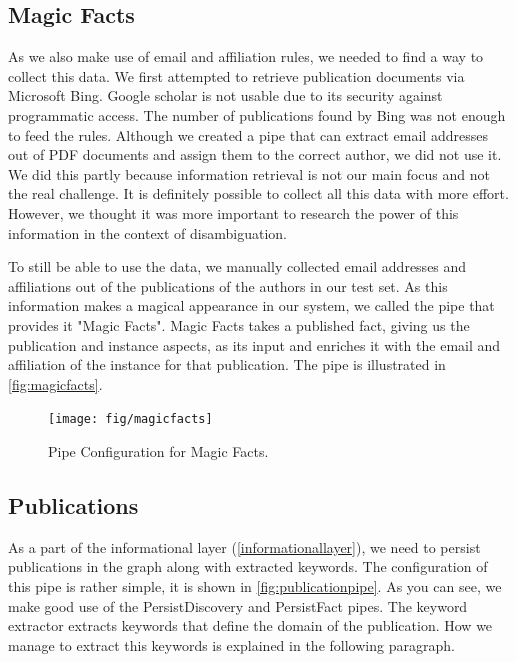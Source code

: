 \subsection{Magic Facts}

As we also make use of email and affiliation rules, we needed to find a way to collect this data. We first attempted to retrieve publication documents via Microsoft Bing. Google scholar is not usable due to its security against programmatic access. The number of publications found by Bing was not enough to feed the rules. Although we created a pipe that can extract email addresses out of PDF documents and assign them to the correct author, we did not use it. We did this partly because information retrieval is not our main focus and not the real challenge. It is definitely possible to collect all this data with more effort. However, we thought it was more important to research the power of this information in the context of disambiguation.

To still be able to use the data, we manually collected email addresses and affiliations out of the publications of the authors in our test set. As this information makes a magical appearance in our system, we called the pipe that provides it "Magic Facts". Magic Facts takes a published fact, giving us the publication and instance aspects, as its input and enriches it with the email and affiliation of the instance for that publication. The pipe is illustrated in \autoref{fig:magicfacts}.

\begin{figure}[htb]
	\centering
		\texttt{[image: fig/magicfacts]}
	\caption{Pipe Configuration for Magic Facts.}
	\label{fig:magicfacts}
\end{figure}

\subsection{Publications}

As a part of the informational layer (\autoref{informationallayer}), we need to persist publications in the graph along with extracted keywords. The configuration of this pipe is rather simple, it is shown in \autoref{fig:publicationpipe}. As you can see, we make good use of the PersistDiscovery and PersistFact pipes. The keyword extractor extracts keywords that define the domain of the publication. How we manage to extract this keywords is explained in the following paragraph.

